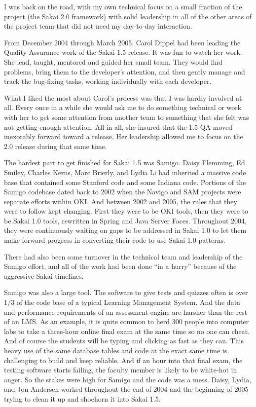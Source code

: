 \documentclass[12pt]{book}
\begin{document}
I was back on the road, with my own technical focus
on a small fraction of the project (the Sakai 2.0
framework) with solid leadership in all of the other
areas of the project team that did not need
my day-to-day interaction.

From December 2004 through March 2005, Carol Dippel had been
leading the Quality Assurance work of the Sakai 1.5 release.
It was fun to watch her work.  She lead, taught, mentored and
guided her small team. They would find problems, bring
them to the developer's attention, and then gently manage
and track the bug-fixing tasks, working individually
with each developer.

What I liked the most about Carol's process was that I was
hardly involved at all.  Every once in a while she would
ask me to do something technical or work with her
to get some attention from another team to something
that she felt was not getting enough attention.  All
in all, she insured that the 1.5 QA moved inexorably
forward toward a release.  Her leadership allowed me
to focus on the 2.0 release during that same time.

The hardest part to get finished for Sakai 1.5
was Samigo.   Daisy Flemming, Ed Smiley, Charles Kerns, Marc Brierly,
and Lydia Li had inherited
a massive code base that contained some Stanford code and
some Indiana code.  Portions of the Samigo codebase dated back to
2002 when the Navigo and SAM projects were separate
efforts within OKI.  And between 2002 and 2005, the rules
that they were to follow kept changing.  First they were
to be OKI tools, then they were to be Sakai 1.0 tools,
rewritten in Spring and Java Server Faces.  Throughout
2004, they were continuously waiting on gaps to be
addressed in Sakai 1.0 to let them make forward progress in
converting their code to use Sakai 1.0 patterns.

There had also been some turnover in the technical team
and leadership of the Samigo effort, and all of the work
had been done ``in a hurry'' because of the aggressive
Sakai timelines.

Samigo was also a large tool.  The software to give tests and
quizzes often is over 1/3 of the code base of a typical
Learning Management System.  And the data and performance
requirements of an assessment engine are harsher
than the rest of an LMS.  As an example, it is quite common
to herd 300 people into computer labs to take a three-hour
online final exam at the same time so no one can cheat.
And of course the students will be typing and clicking
as fast as they can.  This heavy use of the same database
tables and code at the exact same time is challenging
to build and keep reliable.  And if an hour into that final
exam, the testing software starts failing, the faculty member
is likely to be white-hot in anger.
So the stakes were high for Samigo and the code
was a mess.  Daisy, Lydia, and Jon Andersen worked
throughout the end of 2004 and the beginning of 2005
trying to clean it up and shoehorn it into Sakai 1.5.
\end{document}
